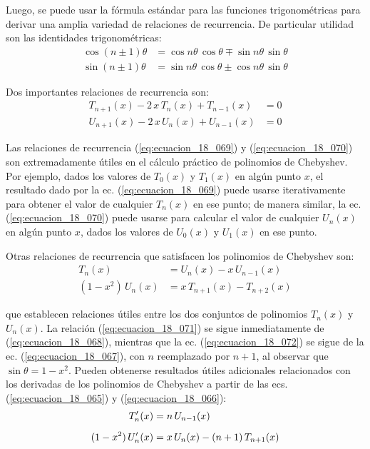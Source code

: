 Luego, se puede usar la fórmula estándar para las funciones trigonométricas para derivar una amplia variedad de relaciones de recurrencia. De particular utilidad son las identidades trigonométricas:
\begin{align}
\cos (n \pm 1)\theta &= \cos n \theta \, \cos \theta \mp \sin n \theta \, \sin \theta \label{eq:ecuacion_18_067} \\[0.5em]
\sin (n \pm 1)\theta &= \sin n \theta \, \cos \theta \pm \cos n \theta \, \sin \theta \label{eq:ecuacion_18_068}
\end{align}

Dos importantes relaciones de recurrencia son:
\begin{align}
T_{n+1} (x) - 2 \, x \, T_{n} (x) + T_{n-1} (x) &= 0 \label{eq:ecuacion_18_069} \\[0.5em]
U_{n+1} (x) - 2 \, x \, U_{n} (x) + U_{n-1} (x) &= 0 \label{eq:ecuacion_18_070}
\end{align}

Las relaciones de recurrencia (\ref{eq:ecuacion_18_069}) y (\ref{eq:ecuacion_18_070}) son extremadamente útiles en el cálculo práctico de polinomios de Chebyshev. Por ejemplo, dados los valores de $T_{0} (x)$ y $T_{1} (x)$ en algún punto $x$, el resultado dado por la ec. (\ref{eq:ecuacion_18_069}) puede usarse iterativamente para obtener el valor de cualquier $T_{n} (x)$ en ese punto; de manera similar, la ec. (\ref{eq:ecuacion_18_070}) puede usarse para calcular el valor de cualquier $U_{n} (x)$ en algún punto $x$, dados los valores de $U_{0} (x)$ y $U_{1} (x)$ en ese punto.
\par
Otras relaciones de recurrencia que satisfacen los polinomios de Chebyshev son:
\begin{align}
T_{n} (x) &= U_{n}(x) - x \, U_{n-1} (x) \label{eq:ecuacion_18_071} \\[0.5em]
(1 - x^{2}) \, U_{n} (x) &= x \, T_{n+1} (x) - T_{n+2} (x) \label{eq:ecuacion_18_072}
\end{align}

que establecen relaciones útiles entre los dos conjuntos de polinomios $T_{n} (x)$ y $U_{n} (x)$. La relación (\ref{eq:ecuacion_18_071}) se sigue inmediatamente de (\ref{eq:ecuacion_18_068}), mientras que la ec. (\ref{eq:ecuacion_18_072}) se sigue de la ec. (\ref{eq:ecuacion_18_067}), con $n$ reemplazado por $n + 1$, al observar que $\sin \theta = 1 - x^{2}$. Pueden obtenerse resultados útiles adicionales relacionados con los derivadas de los polinomios de Chebyshev a partir de las ecs. (\ref{eq:ecuacion_18_065}) y (\ref{eq:ecuacion_18_066}):
\begin{align*}
{T}^{\prime}_{n} (x) &= n \, U_{n-1} (x) \\[0.5em]
(1 - x^{2}) \, {U}^{\prime}_{n} (x) &= x \, U_{n} (x) - (n + 1) \, T_{n+1} (x)
\end{align*}
